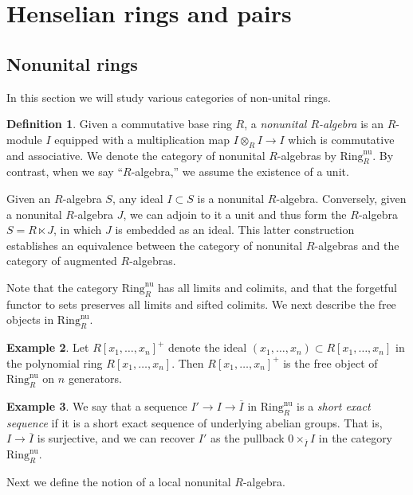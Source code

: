 \documentclass{amsart}
\theoremstyle{definition}
\newtheorem{definition}{Definition}[section]
\newtheorem{example}[definition]{Example}
\newcommand{\nur}{\mathrm{Ring}^{\mathrm{nu}}_R}
\begin{document}
\section{Henselian rings and pairs}


\subsection{Nonunital rings}
In this section we will study various categories of non-unital rings. 

\begin{definition} 
Given a commutative base ring $R$, a \emph{nonunital $R$-algebra}
is an $R$-module $I$ equipped with a multiplication map $I \otimes_R I \to I$
which is commutative and associative. We denote the category of nonunital $R$-algebras by $\nur$.
By contrast, when we say
``$R$-algebra,'' we assume the existence of a unit.  
\end{definition} 

Given an $R$-algebra $S$, any ideal $I \subset S$ is a nonunital $R$-algebra. 
Conversely, given a nonunital $R$-algebra $J$, we can adjoin to it a unit and thus form the $R$-algebra $S = R
\ltimes J$, in which $J$ is embedded as an ideal. This latter construction establishes an equivalence between the category of nonunital $R$-algebras and the category of augmented $R$-algebras. 

Note that the category $\nur$ has all limits and colimits, and that the forgetful
functor to sets preserves all limits and sifted colimits. We next describe the free objects in
$\nur$.
\begin{example} 
Let $R[x_1, \dots, x_n]^+$ denote the ideal $(x_1, \dots, x_n) \subset
R[x_1, \dots, x_n]$ in the polynomial ring $R[x_1, \dots, x_n]$.  
Then $R[x_1, \dots, x_n]^+$ is the free object of $\nur$ on $n$ generators.
\end{example} 

\begin{example} 
We say that a sequence $I' \to I \to \overline{I}$ in $\nur$ is a \emph{short
exact sequence}
if it is a short exact sequence of underlying abelian groups. 
That is, $I \to \overline{I}$ is surjective, and we can recover $I'$ as the
pullback $0 \times_{\overline{I}} I$ in the category $\nur$. 
\end{example} 


Next we define the notion of a local nonunital $R$-algebra.
\end{document}

